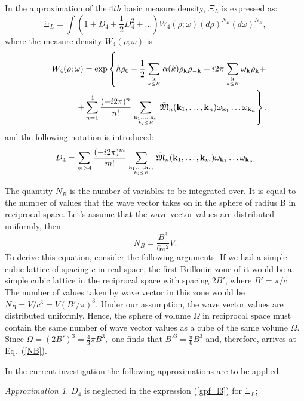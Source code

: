 In the approximation of the $4th$ basic measure density, $\Xi_L$ is expressed as:
\begin{equation}
	\label{gpf_l3}
	\Xi_L = \int (1 + D_4 + \frac12D_4^2 + \dotsc) W_4 (\rho;\omega) (d\rho)^{N_B}(d\omega)^{N_B}, 
\end{equation}
where the measure density $W_4(\rho; \omega)$ is
\begin{eqnarray}
	\label{meas_dens_1}
	&& W_4(\rho;\omega) = \exp \left\{ h\rho_0
	- \frac12  \sum\limits_{{\vb k}\atop k\le B} \alpha(k) \rho_{\vb k} \rho_{-{\vb k}}
	+ i2\pi \sum\limits_{{\vb k} \atop k\le B} \omega_{\vb k} \rho_{\vb k} + \right.  \nonumber\\
	&& \left.+
	\sum\limits_{n=1}^4 \frac{(-i2\pi)^n}{n!} 
	\sum\limits_{\vb{k}_1,\dotsc,\vb{k}_n\atop{k_i \le B}} \tilde{\frak M}_n(\vb{k}_1,\dotsc,\vb{k}_n)
	\omega_{{\vb k}_1} \dots \omega_{{\vb k}_n} \right\}.
\end{eqnarray}
and the following notation is introduced:
\begin{equation}
	D_4 = \sum_{m>4}\frac{(-i2\pi)^m}{m!} \sum\limits_{\vb{k}_1,\dotsc,\vb{k}_m\atop{k_i \le B}}
	\tilde{\frak M}_n(\vb{k}_1,\dotsc,\vb{k}_m)
	\omega_{{\vb k}_1} \dots \omega_{{\vb k}_m}
\end{equation}

The quantity $N_B$ is the number of variables to be integrated over. It is equal to the
number of values that the wave vector takes on in the sphere of radius B in reciprocal space. Let's assume that the wave-vector values are distributed uniformly, then
\begin{equation}
	\label{NB}
	N_B = \frac{B^3}{6\pi^2}V.
\end{equation}
To derive this equation, consider the following arguments. If we had a simple cubic lattice of spacing
$c$ in real space, the first Brillouin zone of it would be a simple cubic lattice in the reciprocal
space with spacing $2B'$, where $B'=\pi/c$. The number of values taken by wave vector in this zone
would be $N_{B} = V/c^3 = V(B'/\pi)^3.$ Under our assumption, the wave vector values are distributed
uniformly. Hence, the sphere of volume $\Omega$ in reciprocal space must contain the same number of wave
vector values as a cube of the same volume $\Omega$. Since $\Omega = (2B')^3 = \frac43\pi B^3,$ one finds that $B'^3=\frac{\pi}{6}B^3$ and, therefore, arrives at Eq.~(\ref{NB}).

In the current investigation the following approximations are to be applied.

{\it Approximation 1.} $D_4$ is neglected in the expression (\ref{gpf_l3}) for $\Xi_L$;

